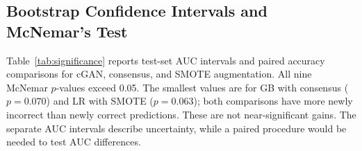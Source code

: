 \documentclass[journal]{IEEEtran}
\begin{document}
\subsection{Bootstrap Confidence Intervals and McNemar's Test}

Table~\ref{tab:significance} reports test-set AUC intervals and paired accuracy comparisons for cGAN, consensus, and SMOTE augmentation. All nine McNemar $p$-values exceed 0.05. The smallest values are for GB with consensus ($p=0.070$) and LR with SMOTE ($p=0.063$); both comparisons have more newly incorrect than newly correct predictions. These are not near-significant gains. The separate AUC intervals describe uncertainty, while a paired procedure would be needed to test AUC differences.

\begin{table}[!htbp]
  \centering
  \caption{Test-Set AUC with 95\% Bootstrap Confidence Intervals (1000 Resamples) and McNemar's Exact Test Against the Baseline ($\alpha = 0.05$), N\_Days Excluded from Classifier Input. $n_{10}$ counts patients the baseline classified correctly and the augmented model did not; $n_{01}$ counts the reverse. McNemar compares each augmented scenario against Scenario~A, so no test applies to the baseline rows.}
  \label{tab:significance}
\end{table}
\end{document}
